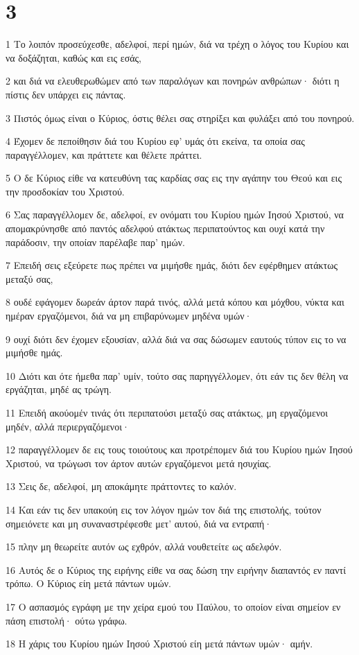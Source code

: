 \chapter{3}

\par 1 Το λοιπόν προσεύχεσθε, αδελφοί, περί ημών, διά να τρέχη ο λόγος του Κυρίου και να δοξάζηται, καθώς και εις εσάς,
\par 2 και διά να ελευθερωθώμεν από των παραλόγων και πονηρών ανθρώπων· διότι η πίστις δεν υπάρχει εις πάντας.
\par 3 Πιστός όμως είναι ο Κύριος, όστις θέλει σας στηρίξει και φυλάξει από του πονηρού.
\par 4 Έχομεν δε πεποίθησιν διά του Κυρίου εφ' υμάς ότι εκείνα, τα οποία σας παραγγέλλομεν, και πράττετε και θέλετε πράττει.
\par 5 Ο δε Κύριος είθε να κατευθύνη τας καρδίας σας εις την αγάπην του Θεού και εις την προσδοκίαν του Χριστού.
\par 6 Σας παραγγέλλομεν δε, αδελφοί, εν ονόματι του Κυρίου ημών Ιησού Χριστού, να απομακρύνησθε από παντός αδελφού ατάκτως περιπατούντος και ουχί κατά την παράδοσιν, την οποίαν παρέλαβε παρ' ημών.
\par 7 Επειδή σεις εξεύρετε πως πρέπει να μιμήσθε ημάς, διότι δεν εφέρθημεν ατάκτως μεταξύ σας,
\par 8 ουδέ εφάγομεν δωρεάν άρτον παρά τινός, αλλά μετά κόπου και μόχθου, νύκτα και ημέραν εργαζόμενοι, διά να μη επιβαρύνωμεν μηδένα υμών·
\par 9 ουχί διότι δεν έχομεν εξουσίαν, αλλά διά να σας δώσωμεν εαυτούς τύπον εις το να μιμήσθε ημάς.
\par 10 Διότι και ότε ήμεθα παρ' υμίν, τούτο σας παρηγγέλλομεν, ότι εάν τις δεν θέλη να εργάζηται, μηδέ ας τρώγη.
\par 11 Επειδή ακούομέν τινάς ότι περιπατούσι μεταξύ σας ατάκτως, μη εργαζόμενοι μηδέν, αλλά περιεργαζόμενοι·
\par 12 παραγγέλλομεν δε εις τους τοιούτους και προτρέπομεν διά του Κυρίου ημών Ιησού Χριστού, να τρώγωσι τον άρτον αυτών εργαζόμενοι μετά ησυχίας.
\par 13 Σεις δε, αδελφοί, μη αποκάμητε πράττοντες το καλόν.
\par 14 Και εάν τις δεν υπακούη εις τον λόγον ημών τον διά της επιστολής, τούτον σημειόνετε και μη συναναστρέφεσθε μετ' αυτού, διά να εντραπή·
\par 15 πλην μη θεωρείτε αυτόν ως εχθρόν, αλλά νουθετείτε ως αδελφόν.
\par 16 Αυτός δε ο Κύριος της ειρήνης είθε να σας δώση την ειρήνην διαπαντός εν παντί τρόπω. Ο Κύριος είη μετά πάντων υμών.
\par 17 Ο ασπασμός εγράφη με την χείρα εμού του Παύλου, το οποίον είναι σημείον εν πάση επιστολή· ούτω γράφω.
\par 18 Η χάρις του Κυρίου ημών Ιησού Χριστού είη μετά πάντων υμών· αμήν.


